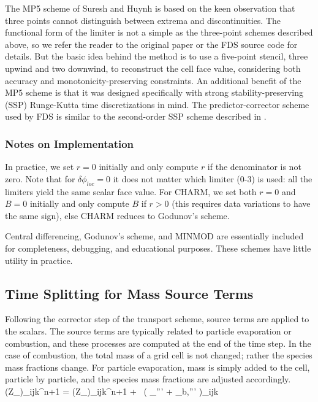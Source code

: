 \begin{description}
The MP5 scheme of Suresh and Huynh \cite{Suresh:1997} is based on the keen observation that three points cannot distinguish between extrema and discontinuities.  The functional form of the limiter is not a simple as the three-point schemes described above, so we refer the reader to the original paper or the FDS source code for details.  But the basic idea behind the method is to use a five-point stencil, three upwind and two downwind, to reconstruct the cell face value, considering both accuracy and monotonicity-preserving constraints.  An additional benefit of the MP5 scheme is that it was designed specifically with strong stability-preserving (SSP) Runge-Kutta time discretizations in mind.  The predictor-corrector scheme used by FDS is similar to the second-order SSP scheme described in \cite{Gottlieb:2001}.
\end{description}


\subsubsection{Notes on Implementation}

In practice, we set $r=0$ initially and only compute $r$ if the denominator is not zero.  Note that for $\delta \phi_{loc}=0$ it does not matter which limiter (0-3) is used: all the limiters yield the same scalar face value.  For CHARM, we set both $r=0$ and $B=0$ initially and only compute $B$ if $r>0$ (this requires data variations to have the same sign), else CHARM reduces to Godunov's scheme.

Central differencing, Godunov's scheme, and MINMOD are essentially included for completeness, debugging, and educational purposes.  These schemes have little utility in practice.

\subsection{Time Splitting for Mass Source Terms}
\label{sec_time_splitting}

Following the corrector step of the transport scheme, source terms are applied to the scalars.  The source terms are typically related to particle evaporation or combustion, and these processes are computed at the end of the time step. In the case of combustion, the total mass of a grid cell is not changed; rather the species mass fractions change. For particle evaporation, mass is simply added to the cell, particle by particle, and the species mass fractions are adjusted accordingly.
\be \label{eq:mass_source_terms}
   (\rho Z_\alpha)_{ijk}^{n+1} = (\rho Z_\alpha)_{ijk}^{n+1} + \dt \, \left( \dm_{\alpha}''' + \dm_{b,\alpha}''' \right)_{ijk}
\ee


